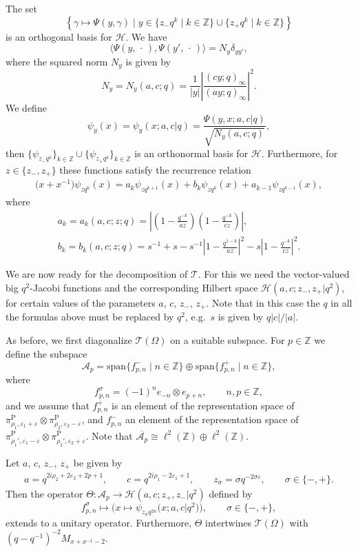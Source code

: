 \documentclass[pdftex]{sigma}
\numberwithin{equation}{section}
\numberwithin{theorem}{section}
\numberwithin{proposition}{section}
\numberwithin{lemma}{section}
\numberwithin{corollary}{section}
\numberwithin{definition}{section}
\numberwithin{example}{section}
\numberwithin{remark}{section}
\numberwithin{note}{section}
\newcommand{\Z}{\mathbb Z}
\newcommand{\eps}{\varepsilon}
\begin{document}
The set
\[
\left\{\gamma \mapsto \Psi(y,\gamma) \mid y \in \big\{z_-q^k \mid k \in \Z\big\} \cup \big\{z_+q^k \mid k \in \Z\big\} \right\}
\]
is an orthogonal basis for $\mathcal H$. We have
\[
\langle \Psi(y,\,\cdot\,),\Psi(y',\,\cdot\,)\rangle = N_y\delta_{yy'},
\]
where the squared norm $N_y$ is given by
\[
N_y=N_y(a,c;q) =\frac1{|y|}\left| \frac{(cy;q)_\infty}{(ay;q)_\infty } \right|^2.
\]
We def\/ine
\[
\psi_y(x)=\psi_y(x;a,c|q) = \frac{\Psi(y,x;a,c|q)}{\sqrt{N_y(a,c;q)}},
\]
then $\{\psi_{z_-q^k}\}_{k \in \Z} \cup \{\psi_{z_+q^k}\}_{k \in \Z}$ is an orthonormal basis for $\mathcal H$. Furthermore, for $z \in \{ z_-,z_+\}$ these functions satisfy the recurrence relation
\begin{gather} \label{eq:recrelvvbigqJac}
\big(x+x^{-1}\big) \psi_{zq^k}(x)=a_k \psi_{z q^{k+1}}(x) + b_k \psi_{z q^k}(x) + a_{k-1} \psi_{z q^{k-1}}(x),
\end{gather}
where
\begin{gather*}
a_k=a_k(a,c;z;q) = \left|\left(1-\frac{q^{-k}}{az}\right)\left(1-\frac{q^{-k}}{cz} \right) \right|,\\
b_k=b_k(a,c;z;q) = s^{-1}+s-s^{-1}\left|1-\frac{q^{1-k}}{az}\right|^2- s\left|1-\frac{q^{-k}}{cz}\right|^2.
\end{gather*}

We are now ready for the decomposition of $\mathcal T$. For this we need the vector-valued big $q^2$-Jacobi functions and the corresponding Hilbert space $\mathcal H(a,c;z_-,z_+|q^2)$, for certain values of the parameters $a$, $c$, $z_-$, $z_+$. Note that in this case the $q$ in all the formulas above must be replaced by $q^2$, e.g.~$s$ is given by $q|c|/|a|$.

As before, we f\/irst diagonalize $\mathcal T(\Omega)$ on a suitable subspace. For $p \in \Z$ we def\/ine the subspace
\[
\mathcal A_p = \mathrm{span}\{ f_{p,n}^- \mid n \in \Z\} \oplus \mathrm{span}\{ f_{p,n}^+ \mid n \in \Z\},
\]
where
\[
f_{p,n}^\sigma = (-1)^n e_{-n} \otimes e_{p+n}, \qquad n,p \in \Z,
\]
and we assume that $f_{p,n}^+$ is an element of the representation space of $\pi_{\rho_1,\eps_1+\eps}^{\mathrm P} \otimes \pi_{\rho_2,\eps_2-\eps}^{\mathrm P}$, and $f_{p,n}^-$ an element of the representation space of $\pi_{\rho_1',\eps_1-\eps}^{\mathrm P} \otimes \pi_{\rho_2',\eps_2+\eps}^{\mathrm P}$. Note that $\overline{\mathcal A_p} \cong \ell^2(\Z) \oplus \ell^2(\Z)$.

\begin{proposition} \label{prop:TePrincipal}
Let $a$, $c$, $z_-$, $z_+$ be given by
\begin{gather} \label{eq:acz-z+}
a=q^{2i\rho_2+2\eps_2+2p+1}, \qquad c=q^{2i\rho_1-2\eps_1+1}, \qquad z_\sigma= \sigma q^{-2\sigma \eps},  \qquad \sigma \in \{-,+\}.
\end{gather}
Then the operator $\Theta:\mathcal A_p \to \mathcal H(a,c;z_+,z_-|q^2)$ defined by
\[
f_{p,n}^\sigma \mapsto \big(x \mapsto \psi_{z_\sigma q^{2n}}\big(x;a,c|q^2\big)\big), \qquad \sigma \in \{-,+\},
\]
extends to a unitary operator. Furthermore, $\Theta$ intertwines $\mathcal T(\Omega)$ with $(q-q^{-1})^{-2} M_{x+x^{-1}-2}$.
\end{proposition}
\end{document}
